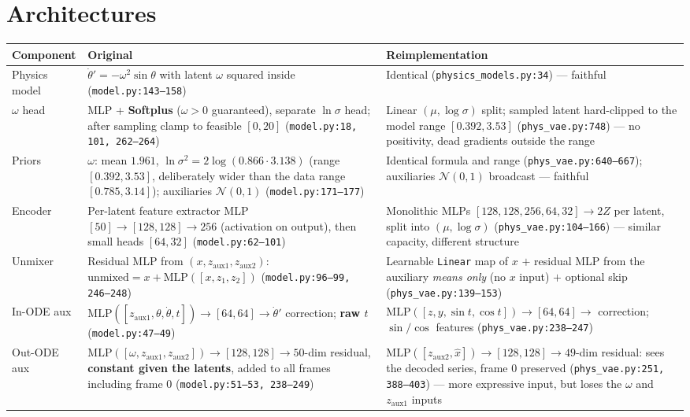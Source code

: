 \documentclass[11pt,a4paper]{article}
\newcommand{\code}[1]{\texttt{#1}}
\begin{document}
\section{Architectures}
\label{sec:arch}

\begin{table}[h]
\centering
\small
\begin{tabularx}{\textwidth}{LXX}
\toprule
\textbf{Component} & \textbf{Original} & \textbf{Reimplementation} \\
\midrule
Physics model & $\dot\theta' = -\omega^2\sin\theta$ with latent $\omega$ squared inside (\code{model.py:143--158}) & Identical (\code{physics\_models.py:34}) --- faithful \\
$\omega$ head & MLP + \textbf{Softplus} ($\omega > 0$ guaranteed), separate $\ln\sigma$ head; after sampling clamp to feasible $[0, 20]$ (\code{model.py:18, 101, 262--264}) & Linear $(\mu, \log\sigma)$ split; sampled latent hard-clipped to the model range $[0.392, 3.53]$ (\code{phys\_vae.py:748}) --- no positivity, dead gradients outside the range \\
Priors & $\omega$: mean $1.961$, $\ln\sigma^2 = 2\log(0.866 \cdot 3.138)$ (range $[0.392, 3.53]$, deliberately wider than the data range $[0.785, 3.14]$); auxiliaries $\mathcal{N}(0, 1)$ (\code{model.py:171--177}) & Identical formula and range (\code{phys\_vae.py:640--667}); auxiliaries $\mathcal{N}(0,1)$ broadcast --- faithful \\
Encoder & Per-latent feature extractor MLP $[50]{\to}[128,128]{\to}256$ (activation on output), then small heads $[64,32]$ (\code{model.py:62--101}) & Monolithic MLPs $[128,128,256,64,32] \to 2Z$ per latent, split into $(\mu, \log\sigma)$ (\code{phys\_vae.py:104--166}) --- similar capacity, different structure \\
Unmixer & Residual MLP from $(x, z_{\mathrm{aux1}}, z_{\mathrm{aux2}})$: $\mathrm{unmixed} = x + \mathrm{MLP}([x, z_1, z_2])$ (\code{model.py:96--99, 246--248}) & Learnable \code{Linear} map of $x$ $+$ residual MLP from the auxiliary \emph{means only} (no $x$ input) $+$ optional skip (\code{phys\_vae.py:139--153}) \\
In-ODE aux & $\mathrm{MLP}([z_{\mathrm{aux1}}, \theta, \dot\theta, t]) \to [64,64] \to \dot\theta'$ correction; \textbf{raw $t$} (\code{model.py:47--49}) & $\mathrm{MLP}([z, y, \sin t, \cos t]) \to [64,64] \to$ correction; $\sin/\cos$ features (\code{phys\_vae.py:238--247}) \\
Out-ODE aux & $\mathrm{MLP}([\omega, z_{\mathrm{aux1}}, z_{\mathrm{aux2}}]) \to [128,128] \to 50$-dim residual, \textbf{constant given the latents}, added to all frames including frame 0 (\code{model.py:51--53, 238--249}) & $\mathrm{MLP}([z_{\mathrm{aux2}}, \hat{x}]) \to [128,128] \to 49$-dim residual: sees the decoded series, frame 0 preserved (\code{phys\_vae.py:251, 388--403}) --- more expressive input, but loses the $\omega$ and $z_{\mathrm{aux1}}$ inputs \\

\end{tabularx}
\end{table}
\end{document}
